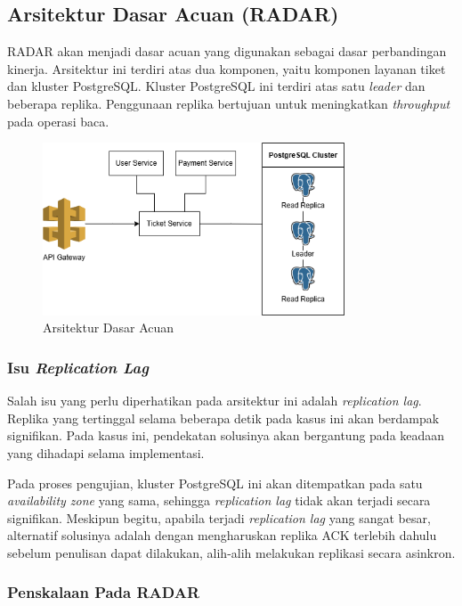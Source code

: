 \subsection{Arsitektur Dasar Acuan (RADAR)}

RADAR akan menjadi dasar acuan yang digunakan sebagai dasar perbandingan kinerja. Arsitektur ini terdiri atas dua komponen, yaitu komponen layanan tiket dan kluster PostgreSQL. Kluster PostgreSQL ini terdiri atas satu \textit{leader} dan beberapa replika. Penggunaan replika bertujuan untuk meningkatkan \textit{throughput} pada operasi baca.

\begin{figure}[htbp]
    \centering
    \includegraphics[width=0.8\textwidth]{resources/appendix/architecture-reference.png}
    \caption{Arsitektur Dasar Acuan}
    \label{fig:baseline-architecture}
\end{figure}

\subsubsection{Isu \textit{Replication Lag}}

Salah isu yang perlu diperhatikan pada arsitektur ini adalah \textit{replication lag}. Replika yang tertinggal selama beberapa detik pada kasus ini akan berdampak signifikan. Pada kasus ini, pendekatan solusinya akan bergantung pada keadaan yang dihadapi selama implementasi.

Pada proses pengujian, kluster PostgreSQL ini akan ditempatkan pada satu \textit{availability zone} yang sama, sehingga \textit{replication lag} tidak akan terjadi secara signifikan. Meskipun begitu, apabila terjadi \textit{replication lag} yang sangat besar, alternatif solusinya adalah dengan mengharuskan replika ACK terlebih dahulu sebelum penulisan dapat dilakukan, alih-alih melakukan replikasi secara asinkron.

\subsubsection{Penskalaan Pada RADAR}

